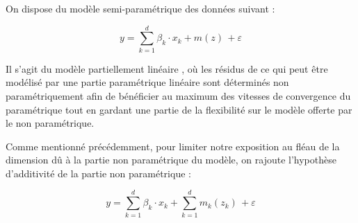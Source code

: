 On dispose du modèle semi-paramétrique des données suivant :

\begin{equation}
	\displaystyle
	y = \sum\limits_{k=1}^d \beta_k \cdot x_k + m(z) \, + \varepsilon
\end{equation}

Il s'agit du modèle \og partiellement linéaire \fg, où les résidus de ce qui peut être modélisé par une partie paramétrique linéaire sont déterminés non paramétriquement afin de bénéficier au maximum des vitesses de convergence du paramétrique tout en gardant une partie de la flexibilité sur le modèle offerte par le non paramétrique.


Comme mentionné précédemment, pour limiter notre exposition au fléau de la dimension dû à la partie non paramétrique du modèle, on rajoute l'hypothèse d'additivité de la partie non paramétrique :

\begin{equation}
	\displaystyle
	y = \sum\limits_{k=1}^d \beta_k \cdot x_k + \sum\limits_{k=1}^d m_k(z_k) \, + \varepsilon
\end{equation}

